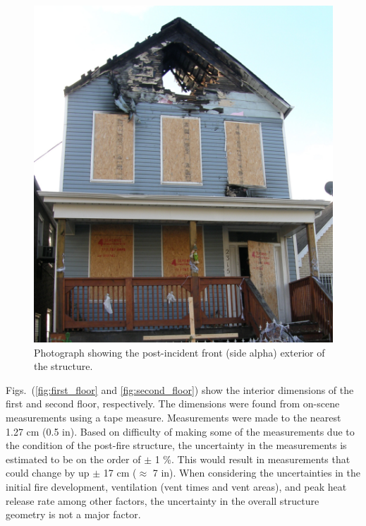 \documentclass[11pt,oneside]{book}
\begin{document}
\begin{figure}[h!]
\centering
\includegraphics[width=.65\textwidth]{../Figures/exterior_alpha}
\caption{Photograph showing the post-incident front (side alpha) exterior of the structure.}
\label{fig:alpha_ex}
\end{figure}

Figs.~(\ref{fig:first_floor} and \ref{fig:second_floor}) show the interior dimensions of the first and second floor, respectively. The dimensions were found from on-scene measurements using a tape measure. Measurements were made to the nearest 1.27 cm (0.5 in). Based on difficulty of making some of the measurements due to the condition of the post-fire structure, the uncertainty in the measurements is estimated to be on the order of $\pm$ 1 \%. This would result in measurements that could change by up $\pm$ 17 cm ($\approx$ 7 in). When considering the uncertainties in the initial fire development, ventilation (vent times and vent areas), and peak heat release rate among other factors, the uncertainty in the overall structure geometry is not a major factor.

\end{document}

